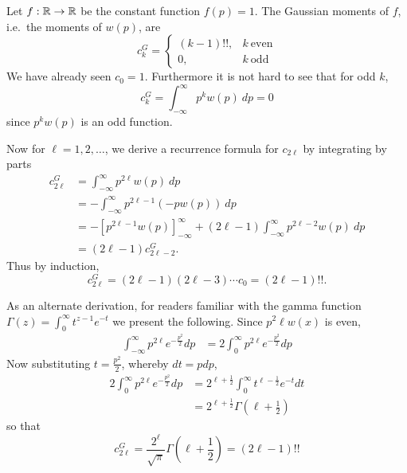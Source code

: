 \begin{myexample}
  Let $f: \mathbb{R} \rightarrow \mathbb{R}$ be the constant function $f(p)=1$. The Gaussian moments of $f$, i.e.\ the moments of $w(p)$, are
  \[
    c^G_k 
    = \begin{cases}
        (k-1)!!, & k~\text{even} \\
        0, & k~\text{odd}
    \end{cases}
  \]
  We have already seen $c_0 = 1$. Furthermore it is not hard to see that for odd $k$, 
  \[
    c^G_k = \int_{-\infty}^\infty p^k w(p) ~dp = 0
  \]
  since $p^k w(p)$ is an odd function.

  Now for $\ell = 1, 2, \ldots$, we derive a recurrence formula for $c_{2\ell}$ by integrating by parts
  \begin{align*}
    c^G_{2\ell}
    &= \int_{-\infty}^\infty p^{2\ell} w(p) ~dp \\
    &= -\int_{-\infty}^\infty p^{2\ell-1} \left(-p w(p)\right) ~dp \\
    &= - \left[p^{2\ell-1} w(p)\right]_{-\infty}^\infty + (2\ell-1)\int_{-\infty}^\infty p^{2\ell-2} w(p) ~dp \\
    &= (2\ell-1)c^G_{2\ell-2}.
  \end{align*}
  Thus by induction,
  \[
    c^G_{2\ell} = (2\ell - 1)(2\ell - 3) \cdots c_0 = (2\ell-1)!!.
  \]

  As an alternate derivation, for readers familiar with the gamma function $\Gamma(z) = \int_0^\infty t^{z-1}e^{-t}$ we present the following. Since $p^2\ell w(x)$ is even,
  \begin{align*}
    \int_{-\infty}^\infty p^{2\ell} e^{-\frac{p^2}2} dp 
      &= 2\int_0^\infty p^{2\ell} e^{-\frac{p^2}2} dp 
  \end{align*}
  Now substituting $t = \frac{p^2}2$, whereby $dt = p dp$,
  \begin{align*}
    2\int_0^\infty p^{2\ell} e^{-\frac{p^2}2} dp 
      &= 2^{\ell+\frac12}\int_0^\infty t^{\ell - \frac12}e^{-t} dt \\
      &= 2^{\ell+\frac12} \Gamma\left(\ell + \frac12\right)
  \end{align*}
  so that
  \[
    c^G_{2\ell} = \frac{2^{\ell}}{\sqrt{\pi}} \Gamma\left(\ell + \frac12\right) = (2\ell - 1)!!
  \]
\end{myexample}




